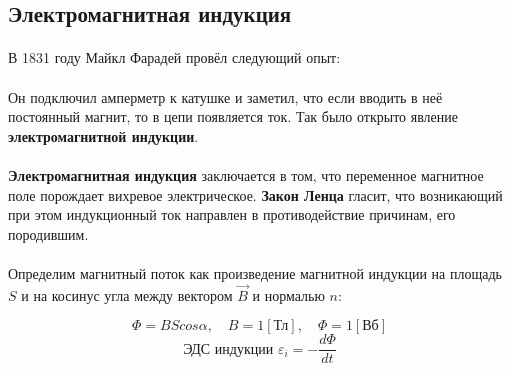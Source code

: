 \documentclass[dvipdfmx]{article}
\begin{document}
\subsection{Электромагнитная индукция}
\paragraph{}

В 1831 году Майкл Фарадей провёл следующий опыт:

\paragraph{}
  \noindent{}

Он подключил амперметр к катушке и заметил, что если вводить в неё постоянный магнит, то в цепи появляется ток.
Так было открыто явление \textbf{электромагнитной индукции}.

\paragraph{}

\textbf{Электромагнитная индукция} заключается в том, что переменное магнитное поле
порождает вихревое электрическое. \textbf{Закон Ленца} гласит, что возникающий при этом индукционный ток
направлен в противодействие причинам, его породившим.

\paragraph{}

Определим магнитный поток как произведение магнитной индукции на площадь $S$ и на косинус угла между вектором
$\vec{B}$ и нормалью $n$:

\begin{equation*}
  \Phi = BScos\alpha, \quad
  B = 1 [\text{Тл}], \quad
  \Phi = 1 [\text{Вб}]
\end{equation*}
\begin{equation*}
  \text{ЭДС индукции } \varepsilon_i = -\frac{d\Phi}{dt}
\end{equation*}
\paragraph{}
\end{document}
